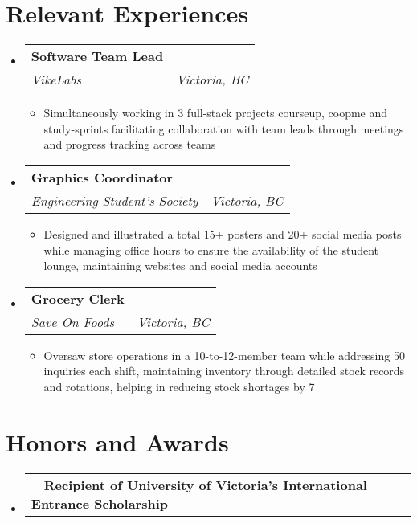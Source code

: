 \documentclass[a4paper,10pt]{article}
\makeatletter
\newcommand{\resumeItemDot}[1]{
  \item \normalsize{#1}
}
\newcommand{\resumeSubheading}[4]{
  \item
    \begin{tabular*}{\dimexpr\textwidth-1.2em\relax}{@{}l@{\extracolsep{\fill}}r@{}}
      \large \textbf{#1} & \text{#2} \\
      \textit{#3} & \textit{#4} \\
    \end{tabular*}\vspace{-2pt}
}
\newcommand{\resumeScholarshipSubheading}[2]{
  \item
    \begin{tabular*}{\dimexpr\textwidth-1.2em\relax}{@{}l@{\extracolsep{\fill}}r@{}}
      \textbullet \ \ \textbf{#1} & \text{#2} \\
    \end{tabular*}\vspace{-2pt}
}
\newenvironment{resumeSubHeadingListStart}
{\begin{itemize}[leftmargin=0.15in, label={}]}
{\end{itemize}}
\newenvironment{resumeItemListStart}
{\begin{itemize}[leftmargin=0.15in, label={$\bullet$}]}
{\end{itemize}}
\makeatother
\begin{document}
\section{Relevant Experiences}
\begin{resumeSubHeadingListStart}
\resumeSubheading
    {Software Team Lead}
    {Feb 2024 – Present}
    {VikeLabs}
    {Victoria, BC}
\begin{resumeItemListStart}
    \resumeItemDot{Simultaneously working in 3 full-stack projects courseup, coopme and study-sprints facilitating collaboration with team leads through meetings and progress tracking across teams}
\end{resumeItemListStart}
\end{resumeSubHeadingListStart}

\begin{resumeSubHeadingListStart}
\resumeSubheading
    {Graphics Coordinator}
    {Jan 2023 – Present}
    {Engineering Student’s Society}
    {Victoria, BC}
\begin{resumeItemListStart}
    \resumeItemDot{Designed and illustrated a total 15+ posters and 20+ social media posts while managing office hours to ensure the availability of the student lounge, maintaining websites and social media accounts}
\end{resumeItemListStart}
\end{resumeSubHeadingListStart}

\begin{resumeSubHeadingListStart}
\resumeSubheading
    {Grocery Clerk}
    {Sept. 2021 – Aug 2023}
    {Save On Foods}
    {Victoria, BC}
\begin{resumeItemListStart}
    \resumeItemDot{Oversaw store operations in a 10-to-12-member team while addressing 50 inquiries each shift, maintaining inventory through detailed stock records and rotations, helping in reducing stock shortages by 7}
\end{resumeItemListStart}
\end{resumeSubHeadingListStart}

\section{Honors and Awards}
\begin{resumeSubHeadingListStart}
\resumeScholarshipSubheading{Recipient of University of Victoria’s International Entrance Scholarship}{2021 – 2022}
\end{resumeSubHeadingListStart}
\end{document}

